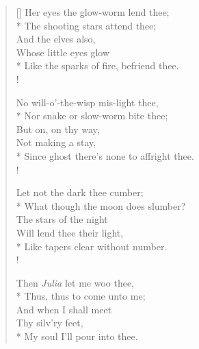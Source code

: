 \documentclass[MAIN]{subfiles}
\begin{document}
\settowidth{\versewidth}{Her eyes the glow-worm lend thee;}
\begin{verse}[\versewidth]
Her eyes the glow-worm lend thee;\\*
The shooting stars attend thee;\\
\vin And the elves also,\\
\vin Whose little eyes glow\\*
Like the sparks of fire, befriend thee.\\!

No will-o'-the-wisp mis-light thee,\\*
Nor snake or slow-worm bite thee;\\
\vin But on, on thy way,\\
\vin Not making a stay,\\*
Since ghost there's none to affright thee.\\!

Let not the dark thee cumber;\\*
What though the moon does slumber?\\
\vin The stars of the night\\
\vin Will lend thee their light,\\*
Like tapers clear without number.\\!

Then \emph{Julia} let me woo thee,\\*
Thus, thus to come unto me;\\
\vin And when I shall meet\\
\vin Thy silv'ry feet,\\*
My soul I'll pour into thee.
\end{verse}
\end{document}
